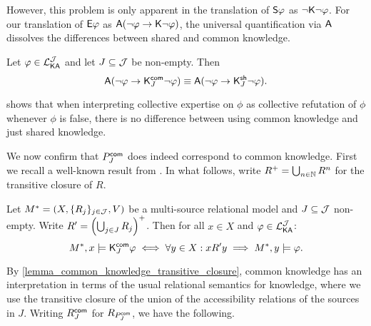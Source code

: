 However, this problem is only apparent in the translation of $\S\phi$ as
$\neg\K\neg\phi$. For our translation of $\E\phi$ as $\A(\neg\phi \limplies
\K\neg\phi)$, the universal quantification via $\A$ dissolves the differences
between shared and common knowledge.

\begin{proposition}
\label{prop_shared_common_collapse}
Let $\phi \in \cLKAJ$ and let $J \subseteq \J$ be non-empty.
Then
\[
\A(\neg\phi \limplies \Kcommon_J\neg\phi)
\equiv
\A(\neg\phi \limplies \Kshared_J\neg\phi).\]
\end{proposition}

 shows that when interpreting collective
expertise on $\phi$ as collective refutation of $\phi$ whenever
$\phi$ is false, there is no difference between using common knowledge
and just shared knowledge.

We now confirm that $\Pcommon_J$ does indeed correspond to common
knowledge. First we recall a well-known result from \citet{fagin2003reasoning}.
In what follows, write $R^\trcls = \bigcup_{n \in \N}{R^n}$ for the transitive
closure of $R$.

\begin{lemma}
\label{lemma_common_knowledge_transitive_closure}
Let $M^* = (X, \{R_j\}_{j \in \J}, V)$ be a multi-source relational
model and $J \subseteq \J$ non-empty. Write $R' =
\left(\bigcup_{j \in J}{R_j}\right)^\trcls$. Then for all $x \in X$
and $\phi \in \cLKAJ$:
\[
M^*, x \models \Kcommon_J\phi
\iff
\forall y \in X: x{R'}y \implies M^*, y \models \phi.\]
\end{lemma}

By \cref{lemma_common_knowledge_transitive_closure}, common knowledge has an
interpretation in terms of the usual relational semantics for knowledge, where
we use the transitive closure of the union of the accessibility relations of
the sources in $J$.
%
Writing $\Rcommon_J$ for $R_{\Pcommon_J}$, we have the following.

